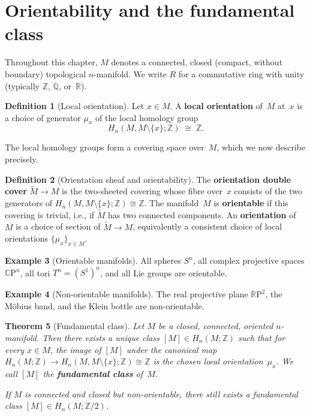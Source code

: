 \documentclass[12pt,a4paper,openany]{book}
\theoremstyle{definition}
\newtheorem{definition}{Definition}[chapter]
\newtheorem{example}[definition]{Example}
\theoremstyle{plain}
\newtheorem{theorem}[definition]{Theorem}
\theoremstyle{remark}
\newcommand{\Z}{\mathbb{Z}}
\newcommand{\Q}{\mathbb{Q}}
\newcommand{\R}{\mathbb{R}}
\newcommand{\RP}{\mathbb{R}\mathrm{P}}
\newcommand{\CP}{\mathbb{C}\mathrm{P}}
\begin{document}
\section{Orientability and the fundamental class}\label{sec:orientability}

Throughout this chapter, $M$ denotes a connected, closed (compact,
without boundary) topological $n$-manifold.
We write $R$ for a commutative ring with unity (typically $\Z$, $\Q$,
or~$\R$).

\begin{definition}[Local orientation]
Let $x\in M$.  A \textbf{local orientation} of~$M$ at~$x$ is a choice
of generator $\mu_x$ of the local homology group
\[
  H_n(M, M\setminus\{x\};\Z) \;\cong\; \Z.
\]
\end{definition}

The local homology groups form a covering space over~$M$, which we now
describe precisely.

\begin{definition}[Orientation sheaf and orientability]
The \textbf{orientation double cover}
$\widetilde{M}\to M$ is the two-sheeted covering whose fibre over~$x$
consists of the two generators of
$H_n(M,M\setminus\{x\};\Z)\cong\Z$.  The manifold~$M$ is
\textbf{orientable} if this covering is trivial, i.e., if
$\widetilde{M}$ has two connected components.  An \textbf{orientation}
of~$M$ is a choice of section of $\widetilde{M}\to M$, equivalently a
consistent choice of local orientations $\{\mu_x\}_{x\in M}$.
\end{definition}

\begin{example}[Orientable manifolds]
All spheres $S^n$, all complex projective spaces $\CP^n$, all tori
$T^n = (S^1)^n$, and all Lie groups are orientable.
\end{example}

\begin{example}[Non-orientable manifolds]
The real projective plane $\RP^2$, the
M\"obius band, and the Klein
bottle are non-orientable.
\end{example}

\begin{theorem}[Fundamental class]\label{thm:fundamental-class}
Let $M$ be a closed, connected, oriented $n$-manifold.  Then there
exists a unique class $[M]\in H_n(M;\Z)$ such that for every
$x\in M$, the image of $[M]$ under the canonical map
$H_n(M;\Z)\to H_n(M,M\setminus\{x\};\Z)\cong\Z$ is the chosen local
orientation~$\mu_x$.  We call $[M]$ the \textbf{fundamental class}
of~$M$.

If $M$ is connected and closed but non-orientable, there still exists
a fundamental class $[M]\in H_n(M;\Z/2)$.
\end{theorem}
\end{document}
